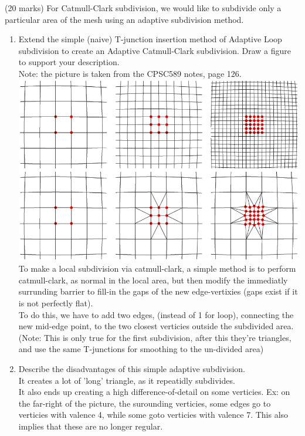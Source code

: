 (20 marks) For Catmull-Clark subdivision, we would like to subdivide only a particular area
of the mesh using an adaptive subdivision method.
\begin{enumerate}
\item Extend the simple (naive) T-junction insertion method of Adaptive Loop subdivision to create an Adaptive Catmull-Clark subdivision. Draw a figure to support your description. \\
Note: the picture is taken from the CPSC589 notes, page 126. \\
\includegraphics[width=400bp]{q6_pic.png} \\
To make a local subdivision via catmull-clark, a simple method is to perform catmull-clark, as normal in the local area, but then modify the immediatly surrunding barrier to fill-in the gaps of the new edge-vertixies (gaps exist if it is not perfectly flat). \\
To do this, we have to add two edges, (instead of 1 for loop), connecting the new mid-edge point, to the two closest verticies outside the subdivided area. \\
(Note: This is only true for the first subdivision, after this they're triangles, and use the same T-junctions for smoothing to the un-divided area)\\

\item Describe the disadvantages of this simple adaptive subdivision. \\
It creates a lot of 'long' triangle, as it repeatidly subdivides. \\
It also ends up creating a high difference-of-detail on some verticies. Ex: on the far-right of the picture, the surounding verticies, some edges go to verticies with valence 4, while some goto verticies with valence 7. This also implies that these are no longer regular. \\

\end{enumerate}
